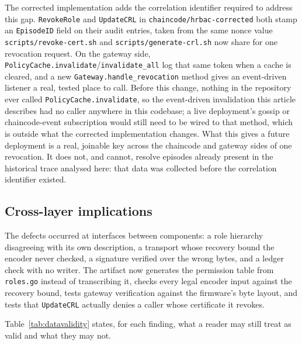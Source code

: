\documentclass[a4paper,fleqn]{cas-dc}
\begin{document}
The corrected implementation adds the correlation identifier required to address this gap. \texttt{RevokeRole} and
\texttt{UpdateCRL} in \texttt{chaincode/hrbac-corrected} both stamp an
\texttt{EpisodeID} field on their audit entries, taken from the same nonce
value \texttt{scripts/revoke-cert.sh} and \texttt{scripts/generate-crl.sh}
now share for one revocation request. On the gateway side,
\texttt{PolicyCache.invalidate}/\texttt{invalidate\_all} log that same
token when a cache is cleared, and a new \texttt{Gateway.handle\_revocation}
method gives an event-driven listener a real, tested place to call. Before
this change, nothing in the repository ever called
\texttt{PolicyCache.invalidate}, so the event-driven invalidation this
article describes had no caller anywhere in this codebase; a live
deployment's gossip or chaincode-event subscription would still need to be
wired to that method, which is outside what the corrected implementation changes. What
this gives a future deployment is a real, joinable key across the
chaincode and gateway sides of one revocation. It does not, and cannot,
resolve episodes already present in the historical trace analysed here:
that data was collected before the correlation identifier existed.

\subsection{Cross-layer implications}
\label{subsec:pm_pattern}

The defects occurred at interfaces between components: a role hierarchy
disagreeing with its own description, a transport whose recovery bound the
encoder never checked, a signature verified over the wrong bytes, and a
ledger check with no writer. The artifact now generates the permission
table from \texttt{roles.go} instead of transcribing it, checks every legal
encoder input against the recovery bound, tests gateway verification
against the firmware's byte layout, and tests that \texttt{UpdateCRL}
actually denies a caller whose certificate it revokes.

Table~\ref{tab:datavalidity} states, for each finding, what a reader may
still treat as valid and what they may not.
\end{document}
